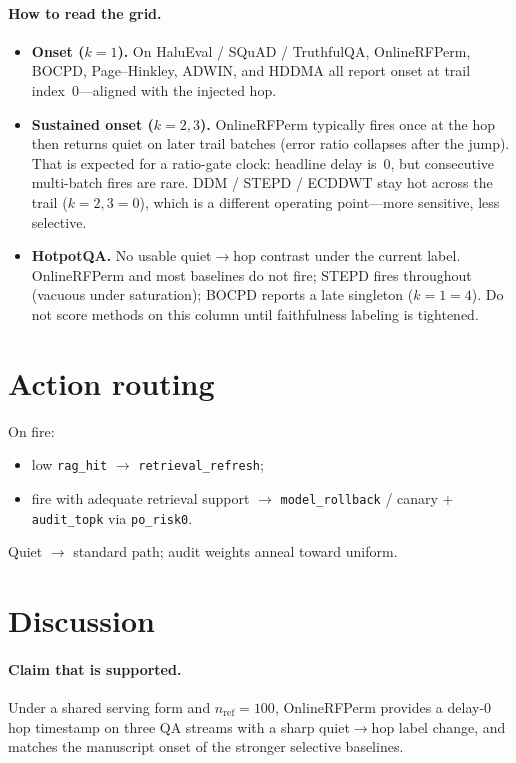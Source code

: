 \documentclass[11pt]{article}
\begin{document}
\paragraph{How to read the grid.}
\begin{itemize}[leftmargin=1.2em]
\item \textbf{Onset ($k=1$).}
On HaluEval / SQuAD / TruthfulQA, OnlineRFPerm, BOCPD, Page--Hinkley, ADWIN,
and HDDMA all report onset at trail index~$0$---aligned with the injected hop.
\item \textbf{Sustained onset ($k=2,3$).}
OnlineRFPerm typically fires once at the hop then returns quiet on later trail
batches (error ratio collapses after the jump). That is expected for a
ratio-gate clock: headline delay is~$0$, but consecutive multi-batch fires are
rare. DDM / STEPD / ECDDWT stay hot across the trail ($k=2,3=0$), which is a
different operating point---more sensitive, less selective.
\item \textbf{HotpotQA.}
No usable quiet$\to$hop contrast under the current label. OnlineRFPerm and most
baselines do not fire; STEPD fires throughout (vacuous under saturation);
BOCPD reports a late singleton ($k=1=4$). Do not score methods on this column
until faithfulness labeling is tightened.
\end{itemize}

\section{Action routing}
On fire:
\begin{itemize}[leftmargin=1.2em]
\item low \texttt{rag\_hit} $\to$ \texttt{retrieval\_refresh};
\item fire with adequate retrieval support $\to$
\texttt{model\_rollback} / canary + \texttt{audit\_topk} via \texttt{po\_risk0}.
\end{itemize}
Quiet $\to$ standard path; audit weights anneal toward uniform.

\section{Discussion}
\paragraph{Claim that is supported.}
Under a shared serving form and $n_{\mathrm{ref}}=100$, OnlineRFPerm provides a
delay-$0$ hop timestamp on three QA streams with a sharp quiet$\to$hop label
change, and matches the manuscript onset of the stronger selective baselines.
\end{document}
